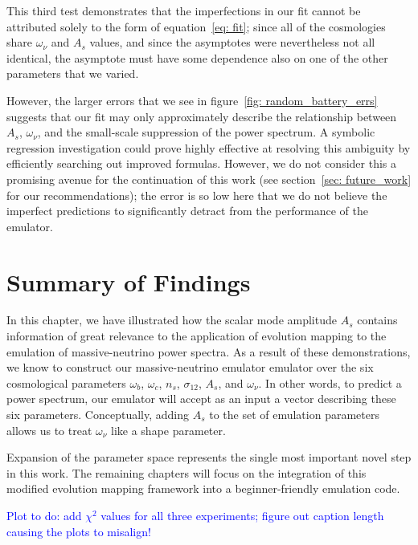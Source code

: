 This third test demonstrates that the imperfections in our fit cannot be
attributed solely to the form of equation~\ref{eq: fit};  
since all of the cosmologies share $\omega_\nu$ and $A_s$ values, and since
the asymptotes were nevertheless not all identical, the
asymptote must have some dependence also on one of the other parameters that
we varied.  

However, the larger errors that we see in
figure~\ref{fig: random_battery_errs} suggests that our fit may only
approximately describe the relationship
between $A_s$, $\omega_\nu$, and the small-scale suppression of the power
spectrum. A symbolic regression investigation could prove highly effective at
resolving this ambiguity by efficiently searching out improved formulas. 
However, we do not consider this a promising avenue
for the continuation of this work (see section~\ref{sec: future_work} for our
recommendations); the error
is so low here that we do not believe the imperfect predictions to
significantly detract from the performance of the emulator.

\section{Summary of Findings}


In this chapter, we have illustrated how the scalar mode amplitude $A_s$
contains information of great relevance to the application of evolution
mapping to the emulation of massive-neutrino power spectra. As a result of 
these demonstrations, we know to construct 
our massive-neutrino emulator emulator over the six cosmological
parameters $\omega_b$, $\omega_c$, $n_s$, $\sigma_{12}$, $A_s$, and
$\omega_\nu$. In other words, to predict a power
spectrum, our emulator will accept as an input a vector describing
these six parameters. Conceptually, adding $A_s$ to the set of
emulation parameters allows us to treat $\omega_\nu$ like a shape
parameter.

Expansion of the parameter space represents the single most 
important novel step in this work. The remaining chapters will
focus on the integration of this modified evolution mapping framework
into a beginner-friendly emulation code.

\textcolor{blue}{Plot to do: add $\chi^2$ values for all three experiments;
	figure out caption length causing the plots to misalign!}